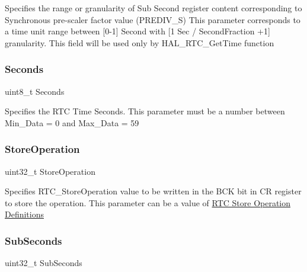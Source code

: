 Specifies the range or granularity of Sub Second register content corresponding to Synchronous pre-\/scaler factor value (P\+R\+E\+D\+I\+V\+\_\+S) This parameter corresponds to a time unit range between \mbox{[}0-\/1\mbox{]} Second with \mbox{[}1 Sec / Second\+Fraction +1\mbox{]} granularity. This field will be used only by H\+A\+L\+\_\+\+R\+T\+C\+\_\+\+Get\+Time function \mbox{\label{struct_r_t_c___time_type_def_a42120bdc40e6f49bb5b4dec78220c87b}} 
\subsubsection{\texorpdfstring{Seconds}{Seconds}}
{\footnotesize\ttfamily uint8\+\_\+t Seconds}

Specifies the R\+TC Time Seconds. This parameter must be a number between Min\+\_\+\+Data = 0 and Max\+\_\+\+Data = 59 \mbox{\label{struct_r_t_c___time_type_def_a26435214093d019db4d67a77a8ad99d1}} 
\subsubsection{\texorpdfstring{Store\+Operation}{StoreOperation}}
{\footnotesize\ttfamily uint32\+\_\+t Store\+Operation}

Specifies R\+T\+C\+\_\+\+Store\+Operation value to be written in the B\+CK bit in CR register to store the operation. This parameter can be a value of \hyperlink{group___r_t_c___store_operation___definitions}{R\+TC Store Operation Definitions} \mbox{\label{struct_r_t_c___time_type_def_a8059189ca602372f4759497c776c8fbb}} 
\subsubsection{\texorpdfstring{Sub\+Seconds}{SubSeconds}}
{\footnotesize\ttfamily uint32\+\_\+t Sub\+Seconds}

